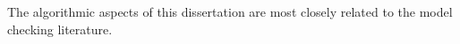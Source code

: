 %
%
%
%
 The algorithmic aspects of this
dissertation are most closely
related to the model checking literature.

